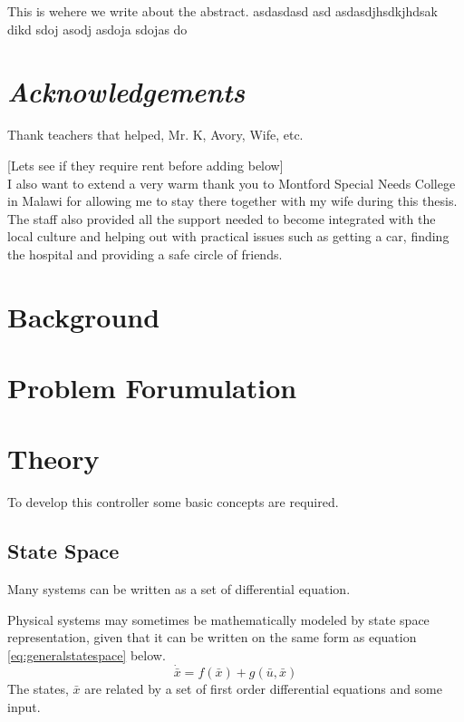 \documentclass{article}
\begin{document}
\abstract
This is wehere we write about the abstract.
asdasdasd
asd
asdasdjhsdkjhdsak dikd  sdoj asodj asdoja sdojas do

\newpage
\section*{\textit{Acknowledgements}}

Thank teachers that helped, Mr. K, Avory, Wife, etc.

[Lets see if they require rent before adding below]\\
I also want to extend a very warm thank you to Montford Special Needs College in Malawi for allowing me to stay there together with my wife during this thesis.
The staff also provided all the support needed to become integrated with the local culture and helping out with practical issues such as getting a car, finding the hospital and providing a safe circle of friends.

\newpage

\tableofcontents

\newpage

\newpage

\section{Background}


\section{Problem Forumulation}


\section{Theory}
To develop this controller some basic concepts are required.
\subsection{State Space}
Many systems can be written as a set of differential equation.

Physical systems may sometimes be mathematically modeled by state space representation, given that it can be written on the same form as equation \ref{eq:generalstatespace} below.
\begin{equation}
    \dot{\bar{x}} = f(\bar{x}) + g(\bar{u},\bar{x})
    \label{eq:generalstatespace}
\end{equation}
The states, $\bar{x}$ are related by a set of first order differential equations and some input.
\end{document}
